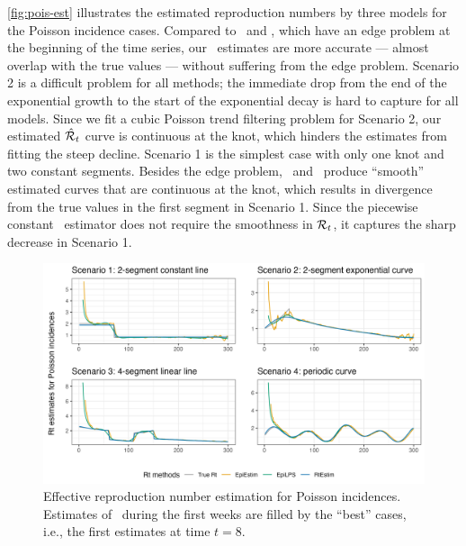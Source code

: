 \autoref{fig:pois-est} illustrates the estimated reproduction numbers by three models for the Poisson incidence cases. Compared to \EpiEstim\ and \EpiLPS, which have an edge problem at the beginning of the time series, our \RtEstim\ estimates are more accurate --- almost overlap with the true values --- without suffering from the edge problem. Scenario 2 is a difficult problem for all methods; the immediate drop from the end of the exponential growth to the start of the exponential decay is hard to capture for all models. Since we fit a cubic Poisson trend filtering problem for Scenario 2, our estimated $\hat{\mathcal{R}}_t$ curve is continuous at the knot, which hinders the estimates from fitting the steep decline. 
Scenario 1 is the simplest case with only one knot and two constant segments. Besides the edge problem, \EpiEstim\ and \EpiLPS\ produce ``smooth'' estimated curves that are continuous at the knot, which results in divergence from the true values in the first segment in Scenario 1. Since the piecewise constant \RtEstim\ estimator does not require the smoothness in $\mathcal{R}_t$, it captures the sharp decrease in Scenario 1. 
\begin{figure}[tb]
    \centering
    \includegraphics*[width=160mm]{fig/Pois-res-plot.png}
    \caption{Effective reproduction number estimation for Poisson incidences. Estimates of \EpiEstim\ during the first weeks are filled by the ``best'' cases, i.e., the first estimates at time $t=8$.}
    \label{fig:pois-est}
\end{figure}



